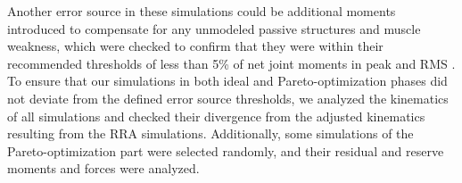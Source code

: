 \documentclass[10pt,letterpaper]{article}
\begin{document}
Another error source in these simulations could be additional moments introduced to compensate for any unmodeled passive structures and muscle weakness, which were checked to confirm that they were within their recommended thresholds of less than 5\% of net joint moments in peak and RMS \cite{93}.\\
To ensure that our simulations in both ideal and Pareto-optimization phases did not deviate from the defined error source thresholds, we analyzed the kinematics of all simulations and checked their divergence from the adjusted kinematics resulting from the RRA simulations. Additionally, some simulations of the Pareto-optimization part were selected randomly, and their residual and reserve moments and forces were analyzed.

\end{document}
